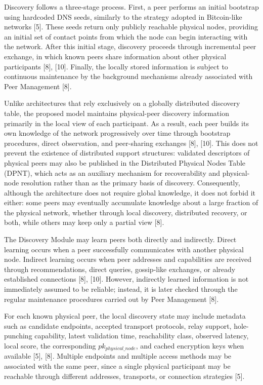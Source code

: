 \documentclass[12pt,a4paper]{article}
\begin{document}
Discovery follows a three-stage process. First, a peer performs an initial bootstrap using hardcoded DNS seeds, similarly to the strategy adopted in Bitcoin-like networks [5]. These seeds return only publicly reachable physical nodes, providing an initial set of contact points from which the node can begin interacting with the network. After this initial stage, discovery proceeds through incremental peer exchange, in which known peers share information about other physical participants [8], [10]. Finally, the locally stored information is subject to continuous maintenance by the background mechanisms already associated with Peer Management [8].

Unlike architectures that rely exclusively on a globally distributed discovery table,
the proposed model maintains physical-peer discovery information primarily in the local
view of each participant. As a result, each peer builds its own knowledge of the
network progressively over time through bootstrap procedures, direct observation, and
peer-sharing exchanges [8], [10]. This does not prevent the existence of distributed support
structures: validated descriptors of physical peers may also be published in the
Distributed Physical Nodes Table (DPNT), which acts as an auxiliary mechanism for
recoverability and physical-node resolution rather than as the primary basis of
discovery. Consequently, although the architecture does not require global knowledge,
it does not forbid it either: some peers may eventually accumulate knowledge about a
large fraction of the physical network, whether through local discovery, distributed
recovery, or both, while others may keep only a partial view [8].

The Discovery Module may learn peers both directly and indirectly. Direct learning occurs when a peer successfully communicates with another physical node. Indirect learning occurs when peer addresses and capabilities are received through recommendations, direct queries, gossip-like exchanges, or already established connections [8], [10]. However, indirectly learned information is not immediately assumed to be reliable; instead, it is later checked through the regular maintenance procedures carried out by Peer Management [8].

For each known physical peer, the local discovery state may include metadata such as candidate endpoints, accepted transport protocols, relay support, hole-punching capability, latest validation time, reachability class, observed latency, local score, the corresponding $pk_{physical\_node}$, and cached encryption keys when available [5], [8]. Multiple endpoints and multiple access methods may be associated with the same peer, since a single physical participant may be reachable through different addresses, transports, or connection strategies [5].
\end{document}
